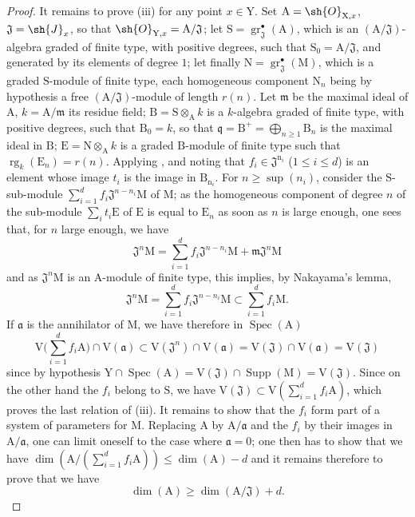 \begin{proof}
It remains to prove (iii) for any point $x\in\mathrm{Y}$. Set $\mathrm{A}=\sh{O}_{\mathrm{X},x}$, $\mathfrak{J}=\sh{J}_x$, so that $\sh{O}_{\mathrm{Y},x}=\mathrm{A}/\mathfrak{J}$; let $\mathrm{S}=\operatorname{gr}^{\bullet}_\mathfrak{J}(\mathrm{A})$, which is an $(\mathrm{A}/\mathfrak{J})$-algebra graded of finite type, with positive degrees, such that $\mathrm{S}_0=\mathrm{A}/\mathfrak{J}$, and generated by its elements of degree $1$; let finally $\mathrm{N}=\operatorname{gr}^{\bullet}_\mathfrak{J}(\mathrm{M})$, which is a graded $\mathrm{S}$-module of finite type, each homogeneous component $\mathrm{N}_n$ being by hypothesis a free $(\mathrm{A}/\mathfrak{J})$-module of length $r(n)$. Let $\mathfrak{m}$ be the maximal ideal of $\mathrm{A}$, $k=\mathrm{A}/\mathfrak{m}$ its residue field; $\mathrm{B}=\mathrm{S}\otimes_\mathrm{A}k$ is a $k$-algebra graded of finite type, with positive degrees, such that $\mathrm{B}_0=k$, so that $\mathfrak{q}=\mathrm{B}^+=\bigoplus_{n\geqslant 1}\mathrm{B}_n$ is the maximal ideal in $\mathrm{B}$; $\mathrm{E}=\mathrm{N}\otimes_\mathrm{A}k$ is a graded $\mathrm{B}$-module of finite type such that $\operatorname{rg}_k(\mathrm{E}_n)=r(n)$. Applying , and noting that $f_i\in\mathfrak{J}^{\mathrm{n}_i}$ ($1\leqslant i\leqslant d$) is an element whose image $t_i$ is the image in $\mathrm{B}_{\mathrm{n}_i}$. For $n\geqslant\sup(n_i)$, consider the $\mathrm{S}$-sub-module $\sum_{i=1}^d f_i\mathfrak{J}^{n-n_i}\mathrm{M}$ of $\mathrm{M}$; as the homogeneous component of degree $n$ of the sub-module $\sum_i t_i\mathrm{E}$ of $\mathrm{E}$ is equal to $\mathrm{E}_n$ as soon as $n$ is large enough, one sees that, for $n$ large enough, we have
\[
\mathfrak{J}^n\mathrm{M} = \sum_{i=1}^d f_i\mathfrak{J}^{n-n_i}\mathrm{M}+\mathfrak{m}\mathfrak{J}^n\mathrm{M}
\]
and as $\mathfrak{J}^n\mathrm{M}$ is an $\mathrm{A}$-module of finite type, this implies, by Nakayama's lemma,
\[
\mathfrak{J}^n\mathrm{M} = \sum_{i=1}^d f_i\mathfrak{J}^{n-n_i}\mathrm{M} \subset \sum_{i=1}^d f_i\mathrm{M}.
\]
If $\mathfrak{a}$ is the annihilator of $\mathrm{M}$, we have therefore  in $\operatorname{Spec}(\mathrm{A})$
\[
\mathrm{V}\Big(\sum_{i=1}^d f_i\mathrm{A}\Big)\cap\mathrm{V}(\mathfrak{a})\subset\mathrm{V}(\mathfrak{J}^n)\cap\mathrm{V}(\mathfrak{a})=\mathrm{V}(\mathfrak{J})\cap\mathrm{V}(\mathfrak{a})=\mathrm{V}(\mathfrak{J})
\]
since by hypothesis $\mathrm{Y}\cap\operatorname{Spec}(\mathrm{A})=\mathrm{V}(\mathfrak{J})\cap\operatorname{Supp}(\mathrm{M})=\mathrm{V}(\mathfrak{J})$. Since on the other hand the $f_i$ belong to $\mathrm{S}$, we have $\mathrm{V}(\mathfrak{J})\subset\mathrm{V}(\sum_{i=1}^d f_i\mathrm{A})$, which proves the last relation of (iii). It remains to show that the $f_i$ form part of a system of parameters for $\mathrm{M}$. Replacing $\mathrm{A}$ by $\mathrm{A}/\mathfrak{a}$ and the $f_i$ by their images in $\mathrm{A}/\mathfrak{a}$, one can limit oneself to the case where $\mathfrak{a}=0$; one then has to show that we have $\dim(\mathrm{A}/(\sum_{i=1}^d f_i\mathrm{A}))\leqslant\dim(\mathrm{A})-d$ and it remains therefore to prove  that we have
\[
\dim(\mathrm{A})\geqslant\dim(\mathrm{A}/\mathfrak{J})+d.
\]


\end{proof}
